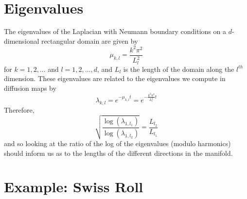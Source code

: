 \documentclass[12pt]{article}
\begin{document}
\section{Eigenvalues}

The eigenvalues of the Laplacian with Neumann boundary conditions on a $d$-dimensional rectangular domain are given by
\begin{equation}
\mu_{k,l} = \frac{k^2 \pi^2}{L_l^2}
\end{equation}
for $k=1, 2, \dots$ and $l=1, 2, \dots, d$, and $L_l$ is the length of the domain along the $l^{th}$ dimension. 
%
These eigenvalues are related to the eigenvalues we compute in diffusion maps by 
\begin{equation}
\lambda_{k,l} = e^{-\mu_{k,l} t} = e^{-\frac{k^2 \pi^2}{L_l^2} t}
\end{equation}
%
Therefore, 
\begin{equation}
\sqrt{\frac{\log(\lambda_{1,l_1})}{\log(\lambda_{1,l_2})}} = 
\frac{L_{l_2}}{L_{l_1}}
\end{equation}
and so looking at the ratio of the log of the eigenvalues (modulo harmonics) should inform us as to the lengths of the different directions in the manifold. 

\section{Example: Swiss Roll}
\end{document}
